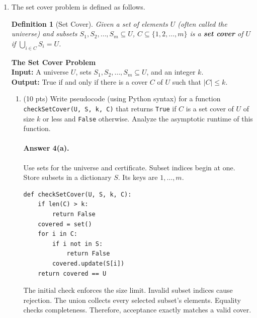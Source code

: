 \documentclass{article}
\newtheorem*{definition}{Definition}
\begin{document}
\begin{enumerate}
\begin{enumerate}
Let $T_{\mathrm{VC}}$ denote the oracle runtime.
The total runtime is $T_{\mathrm{VC}}(G)+O(1+|V|)$.
This is polynomial under the stated assumption.
The returned set needs $O(|V|)$ space.

    \end{enumerate}

    \item The set cover problem is defined as follows.
    \begin{definition}[Set Cover]
    Given a set of elements $U$ (often called the universe) and subsets $S_1, S_2, \dots, S_m \subseteq U$, $C \subseteq \{1, 2, \dots, m\}$ is a \textbf{set cover} of $U$ if $\bigcup_{i \in C} S_i = U$.
    \end{definition}
    \noindent \textbf{The Set Cover Problem} \\
    \noindent \textbf{Input:} A universe $U$, sets $S_1, S_2, \dots, S_m \subseteq U$, and an integer $k$.\\
    \noindent \textbf{Output:} True if and only if there is a cover $C$ of $U$ such that $|C| \leq k$.
    \begin{enumerate}
        \item (10 pts) Write pseudocode (using Python syntax) for a function \verb|checkSetCover(U, S, k, C)| that returns \verb|True| if $C$ is a set cover of $U$ of size $k$ or less and \verb|False| otherwise. Analyze the asymptotic runtime of this function.


\paragraph{Answer 4(a).}\mbox{}\par
Use sets for the universe and certificate.
Subset indices begin at one.
Store subsets in a dictionary $S$.
Its keys are $1,\ldots,m$.

\par\noindent\begin{minipage}{\linewidth}
\begin{lstlisting}
def checkSetCover(U, S, k, C):
    if len(C) > k:
        return False
    covered = set()
    for i in C:
        if i not in S:
            return False
        covered.update(S[i])
    return covered == U
\end{lstlisting}
\end{minipage}\par

The initial check enforces the size limit.
Invalid subset indices cause rejection.
The union collects every selected subset's elements.
Equality checks completeness.
Therefore, acceptance exactly matches a valid cover.


\end{enumerate}
\end{enumerate}
\end{document}
